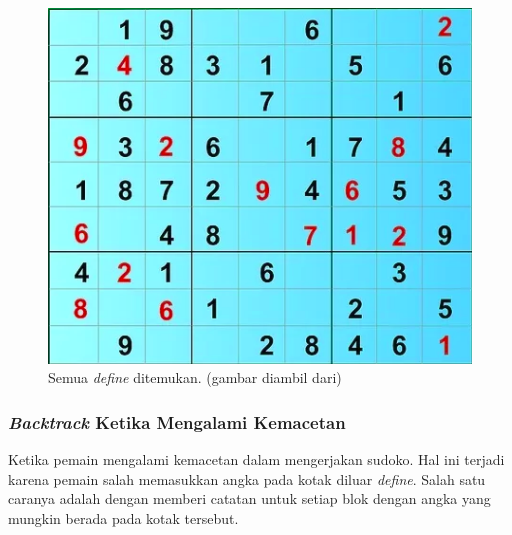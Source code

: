 \begin{figure}[H]
	\begin{centering}
		\includegraphics[scale=0.7]{gambar/solve3}
		
		\caption{Semua \textit{define} ditemukan. (gambar diambil dari)}
	\end{centering}
\end{figure}



\subsubsection{\textit{Backtrack} Ketika Mengalami Kemacetan}

Ketika pemain mengalami kemacetan dalam mengerjakan sudoko. Hal ini terjadi karena pemain salah  memasukkan angka pada kotak diluar \textit{define}. Salah satu caranya adalah dengan memberi catatan untuk setiap blok dengan angka yang mungkin berada  pada kotak tersebut.



